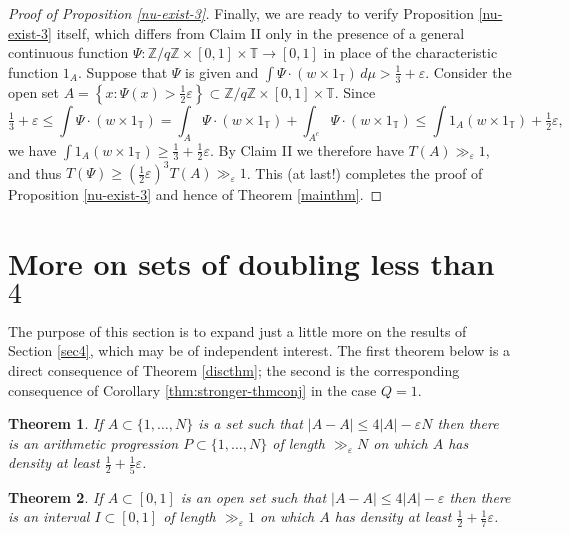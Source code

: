 \documentclass[10pt,reqno]{amsart}
\newtheorem{theorem}{Theorem}[section]
\theoremstyle{definition}
\theoremstyle{remark}
\renewcommand{\leq}{\leqslant}
\renewcommand{\geq}{\geqslant}
\def\Z{\mathbb{Z}}
\def\T{\mathbb{T}}
\def\eps{\varepsilon}
\numberwithin{equation}{section}
\begin{document}
\begin{proof}[Proof of Proposition \ref{nu-exist-3}]
Finally, we are ready to verify Proposition \ref{nu-exist-3} itself, which differs from Claim II only in the presence of a general continuous function $\Psi : \Z/q\Z \times [0,1] \times \T \rightarrow [0,1]$ in place of the characteristic function $1_A$. Suppose that $\Psi$ is given and $\int \Psi\cdot(w\times 1_{\T})\,d\mu > \frac{1}{3} + \eps$. Consider the open set $A = \left\{x: \Psi(x)>\frac{1}{2}\eps\right\} \subset\Z/q\Z\times[0,1]\times \T$. Since \[\tfrac{1}{3} + \eps  \leq \int \Psi \cdot (w\times 1_{\T}) = \int_A \Psi\cdot(w\times 1_{\T}) + \int_{A^c} \Psi\cdot(w\times 1_{\T}) \leq \int 1_A (w\times 1_{\T}) + \tfrac{1}{2}\eps,\] we have $\int 1_A (w\times 1_{\T}) \geq \frac{1}{3} + \frac{1}{2}\eps$. By Claim II we therefore have $T(A) \gg_{\eps} 1$, and thus $T(\Psi) \geq \left(\frac{1}{2}\eps\right)^3 T(A) \gg_{\eps} 1$. This (at last!) completes the proof of Proposition \ref{nu-exist-3} and hence of Theorem \ref{mainthm}.
\end{proof}

\section{More on sets of doubling less than $4$}
\label{sec6}

The purpose of this section is to expand just a little more on the results of Section \ref{sec4}, which may be of independent interest. The first theorem below is a direct consequence of Theorem \ref{discthm}; the second is the corresponding consequence of Corollary \ref{thm:stronger-thmconj} in the case $Q = 1$.

\begin{theorem}\label{int-thm}
If $A \subset \{1,\dots,N\}$ is a set such that $|A - A| \leq 4|A| - \eps N$ then there is an arithmetic progression $P \subset \{1,\dots,N\}$ of length $\gg_{\eps} N$ on which $A$ has density at least $\frac{1}{2} + \tfrac{1}{5}\eps$.
\end{theorem}

\begin{theorem}\label{real-thm}
If $A \subset [0,1]$ is an open set such that $|A - A| \leq 4|A| - \eps$ then there is an interval $I \subset [0,1]$ of length $\gg_{\eps} 1$ on which $A$ has density at least $\frac{1}{2} + \tfrac{1}{7}\eps$.
\end{theorem}
\end{document}
